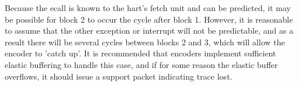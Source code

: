 Because the ecall is known to the hart's fetch unit and can be predicted, it may be possible for block 2 to occur the cycle 
after block 1.  However, it is reasonable to assume that the other exception or interrupt will not be predictable, and as a result
there will be several cycles between blocks 2 and 3, which will allow the encoder to 'catch up'.  It is recommended that encoders
implement sufficient elastic buffering to handle this case, and if for some reason the elastic buffer overflows, it should
issue a support packet indicating trace lost.
